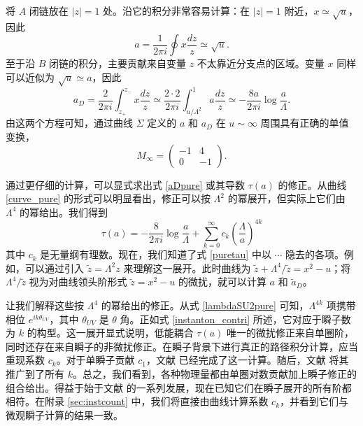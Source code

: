 将 $A$ 闭链放在 $|z|=1$ 处。沿它的积分非常容易计算：在 $|z|=1$ 附近，$x\simeq\sqrt{u}$，因此
\begin{equation}
a=\frac{1}{2\pi i}\oint x\frac{dz}z\simeq \sqrt{u}.
\end{equation}
至于沿 $B$ 闭链的积分，主要贡献来自变量 $z$ 不太靠近分支点的区域。变量 $x$ 同样可以近似为 $\sqrt{u}\simeq a$，因此
\begin{equation}
a_D=\frac{2}{2\pi i} \int^{z_-}_{z_+} x\frac{dz}z\simeq \frac{2\cdot 2}{2\pi i}  \int^1_{u/\Lambda^2} a\frac{dz}z \simeq -\frac{8a}{2\pi i}\log \frac{a}{\Lambda}.\label{aDpure}
\end{equation}
由这两个方程可知，通过曲线 $\Sigma$ 定义的 $a$ 和 $a_D$ 在 $u\sim\infty$ 周围具有正确的单值变换，
\begin{equation}
M_\infty=\begin{pmatrix}
-1 & 4 \\
0  & -1
\end{pmatrix}.
\end{equation}

通过更仔细的计算，可以显式求出式 \eqref{aDpure} 或其导数 $\tau(a)$ 的修正。从曲线 \eqref{curve_pure} 的形式可以明显看出，修正可以按 $\Lambda^2$ 的幂展开，但实际上它们由 $\Lambda^4$ 的幂给出。我们得到
\begin{equation}
\tau(a)= -\frac{8}{2\pi i}\log\frac{a}{\Lambda} + \sum_{k=0}^\infty c_k \left(\frac{\Lambda}{a}\right)^{4k}
\label{tauexpansion}
\end{equation}
其中 $c_k$ 是无量纲有理数。现在，我们知道了式 \eqref{puretau} 中以 $\cdots$ 隐去的各项。例如，可以通过引入 $\tilde z=\Lambda^2 z$ 来理解这一展开。此时曲线为 $\tilde z+\Lambda^4/\tilde z=x^2-u$；将 $\Lambda^4/\tilde z$ 视为对曲线领头阶形式 $\tilde z=x^2-u$ 的微扰，就可以计算 $a$ 和 $\tilde a_D$。

让我们解释这些按 $\Lambda^4$ 的幂给出的修正。从式 \eqref{lambdaSU2pure} 可知，$\Lambda^{4k}$ 项携带相位 $e^{ik\theta_{UV}}$，其中 $\theta_{UV}$ 是 $\theta$ 角。正如式 \eqref{instanton_contri} 所述，它对应于瞬子数为 $k$ 的构型。这一展开显式说明，低能耦合 $\tau(a)$ 唯一的微扰修正来自单圈阶，同时还存在来自瞬子的非微扰修正。在瞬子背景下进行真正的路径积分计算，应当重现系数 $c_k$。对于单瞬子贡献 $c_1$，文献 \cite{Finnell:1995dr} 已经完成了这一计算。随后，文献 \cite{Nekrasov:2002qd,Nekrasov:2003rj} 将其推广到了所有 $k$。总之，我们看到，各种物理量都由单圈对数贡献加上瞬子修正的组合给出。得益于始于文献 \cite{Nekrasov:2002qd} 的一系列发展，现在已知它们在瞬子展开的所有阶都相符。在附录 \ref{sec:instcount} 中，我们将直接由曲线计算系数 $c_k$，并看到它们与微观瞬子计算的结果一致。

